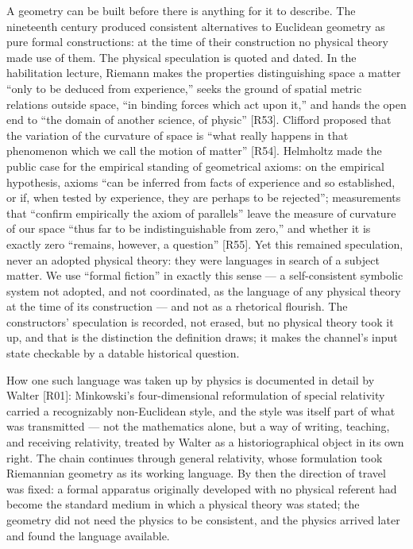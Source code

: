\documentclass[11pt,a4paper]{article}
\begin{document}
A geometry can be built before there is anything for it to describe. The nineteenth century produced consistent alternatives to Euclidean geometry as pure formal constructions: at the time of their construction no physical theory made use of them. The physical speculation is quoted and dated. In the habilitation lecture, Riemann makes the properties distinguishing space a matter ``only to be deduced from experience,'' seeks the ground of spatial metric relations outside space, ``in binding forces which act upon it,'' and hands the open end to ``the domain of another science, of physic'' [R53]. Clifford proposed that the variation of the curvature of space is ``what really happens in that phenomenon which we call the motion of matter'' [R54]. Helmholtz made the public case for the empirical standing of geometrical axioms: on the empirical hypothesis, axioms ``can be inferred from facts of experience and so established, or if, when tested by experience, they are perhaps to be rejected''; measurements that ``confirm empirically the axiom of parallels'' leave the measure of curvature of our space ``thus far to be indistinguishable from zero,'' and whether it is exactly zero ``remains, however, a question'' [R55]. Yet this remained speculation, never an adopted physical theory: they were languages in search of a subject matter. We use ``formal fiction'' in exactly this sense — a self-consistent symbolic system not adopted, and not coordinated, as the language of any physical theory at the time of its construction — and not as a rhetorical flourish. The constructors' speculation is recorded, not erased, but no physical theory took it up, and that is the distinction the definition draws; it makes the channel's input state checkable by a datable historical question.

How one such language was taken up by physics is documented in detail by Walter [R01]: Minkowski's four-dimensional reformulation of special relativity carried a recognizably non-Euclidean style, and the style was itself part of what was transmitted — not the mathematics alone, but a way of writing, teaching, and receiving relativity, treated by Walter as a historiographical object in its own right. The chain continues through general relativity, whose formulation took Riemannian geometry as its working language. By then the direction of travel was fixed: a formal apparatus originally developed with no physical referent had become the standard medium in which a physical theory was stated; the geometry did not need the physics to be consistent, and the physics arrived later and found the language available.
\end{document}
